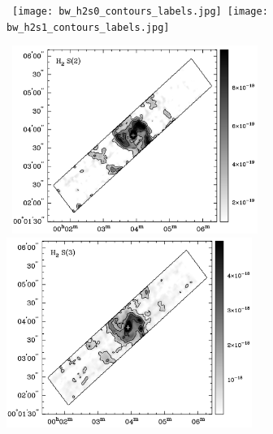 \documentclass[manuscript]{aastex}
\begin{document}
\begin{figure}[!t]
\centerline{\hbox{ \hspace{0.0in} 
\texttt{[image: bw\_h2s0\_contours\_labels.jpg]}
\hspace{0.1in}
\texttt{[image: bw\_h2s1\_contours\_labels.jpg]}}}
\end{figure}
\begin{figure}[!h]
\centerline{\hbox{\hspace{0.0in}
\includegraphics[width=8cm,angle=0]{bw_h2s2_contours.jpg}
\hspace{0.1in}
\includegraphics[width=8cm,angle=0]{bw_h2s3_contours.jpg}}}
\end{figure}
\end{document}
